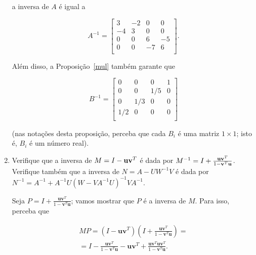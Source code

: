 \documentclass[leqno]{article}
\begin{document}
\begin{enumerate}
\begin{sol}
	\noindent a inversa de $A$ é igual a 

	\begin{equation*} 
		A^{-1} = 
		\begin{bmatrix} 
			3 & -2 & 0 & 0 \\ 
			-4 & 3 & 0 & 0 \\ 
			0 & 0 & 6 & -5 \\ 
			0 & 0 & -7 & 6 \\ 
		\end{bmatrix}.  
	\end{equation*} 

	Além disso, a Proposição~\ref{mul} também garante que 

	\begin{equation*} 
		B^{-1} = 
		\begin{bmatrix} 
			0 & 0 & 0 & 1 \\ 
			0 & 0 & 1/5 & 0 \\ 
			0 & 1/3 & 0 & 0 \\ 
			1/2 & 0 & 0 & 0 \\ 
		\end{bmatrix}   
	\end{equation*} 
	
	\noindent (nas notações desta proposição, perceba que cada $B_{i}$ é uma matriz $1 \times 1$; isto é, $B_{i}$ é um número real). 
\end{sol} 

\item Verifique que a inversa de $M = I - \mathbf{u} \mathbf{v}^T$ é dada por $M^{-1} = I + \frac{\mathbf{u}\mathbf{v}^T}{1 - \mathbf{v}^T\mathbf{u}}$. Verifique também que a inversa de $N = A - UW^{-1}V$ é dada por $N^{-1} = A^{-1} + A^{-1}U(W - VA^{-1}U)^{-1}VA^{-1}$.

\begin{sol} 
	Seja $P = I + \frac{\mathbf{u}\mathbf{v}^T}{1 - \mathbf{v}^T\mathbf{u}}$; vamos mostrar que $P$ é a inversa de $M$. Para isso, perceba que 

	\begin{equation} \label{mp}  
		\begin{split} 
		MP = \left(I - \mathbf{u}\mathbf{v}^T\right)\left(I + \frac{\mathbf{u}\mathbf{v}^T}{1 - \mathbf{v}^T\mathbf{u}}\right) = \\ 
		= I - \frac{\mathbf{u}\mathbf{v}^T}{1 - \mathbf{v}^T\mathbf{u}} - \mathbf{u}\mathbf{v}^T + \frac{\mathbf{u}\mathbf{v}^T\mathbf{u}\mathbf{v}^T}{1 - \mathbf{v}^T\mathbf{u}}.    
		\end{split} 
	\end{equation} 


\end{sol}
\end{enumerate}
\end{document}
